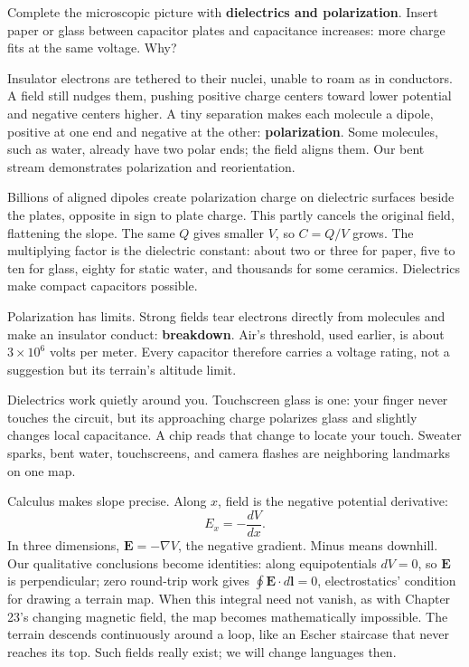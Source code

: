 \begin{mainline}
Complete the microscopic picture with \textbf{dielectrics and polarization}. Insert paper or glass between capacitor plates and capacitance increases: more charge fits at the same voltage. Why?

Insulator electrons are tethered to their nuclei, unable to roam as in conductors. A field still nudges them, pushing positive charge centers toward lower potential and negative centers higher. A tiny separation makes each molecule a dipole, positive at one end and negative at the other: \textbf{polarization}. Some molecules, such as water, already have two polar ends; the field aligns them. Our bent stream demonstrates polarization and reorientation.

Billions of aligned dipoles create polarization charge on dielectric surfaces beside the plates, opposite in sign to plate charge. This partly cancels the original field, flattening the slope. The same \(Q\) gives smaller \(V\), so \(C=Q/V\) grows. The multiplying factor is the dielectric constant: about two or three for paper, five to ten for glass, eighty for static water, and thousands for some ceramics. Dielectrics make compact capacitors possible.

Polarization has limits. Strong fields tear electrons directly from molecules and make an insulator conduct: \textbf{breakdown}. Air's threshold, used earlier, is about \(3\times10^{6}\) volts per meter. Every capacitor therefore carries a voltage rating, not a suggestion but its terrain's altitude limit.

Dielectrics work quietly around you. Touchscreen glass is one: your finger never touches the circuit, but its approaching charge polarizes glass and slightly changes local capacitance. A chip reads that change to locate your touch. Sweater sparks, bent water, touchscreens, and camera flashes are neighboring landmarks on one map.
\end{mainline}

\begin{challenge}
Calculus makes slope precise. Along \(x\), field is the negative potential derivative:
\[
E_x = -\frac{dV}{dx}.
\]
In three dimensions, \(\mathbf{E} = -\nabla V\), the negative gradient. Minus means downhill. Our qualitative conclusions become identities: along equipotentials \(dV=0\), so \(\mathbf{E}\) is perpendicular; zero round-trip work gives \(\oint \mathbf{E}\cdot d\mathbf{l}=0\), electrostatics' condition for drawing a terrain map. When this integral need not vanish, as with Chapter 23's changing magnetic field, the map becomes mathematically impossible. The terrain descends continuously around a loop, like an Escher staircase that never reaches its top. Such fields really exist; we will change languages then.
\end{challenge}

